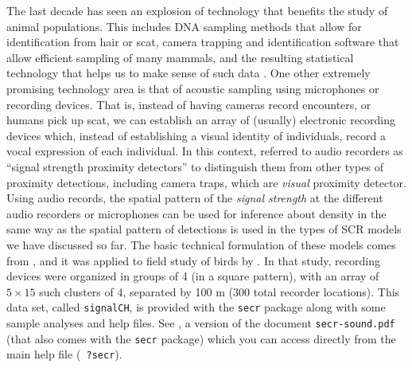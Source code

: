 The last decade has seen an explosion of technology that benefits the
study of animal populations. This includes DNA sampling methods that
allow for identification from hair or scat, camera trapping and
identification software that allow efficient sampling of many
mammals, and the resulting statistical technology that helps us to
make sense of such data \citep{borchers_efford:2008,
  royle_young:2008,efford_etal:2009ecol, gopalaswamy_etal:2012ecol,
  sollmann_etal:2012ecol, chandler_royle:2012}.  One other extremely
promising technology area is that of acoustic sampling using
microphones or recording devices.  That is, instead of having cameras
record encounters, or humans pick up scat, we can establish an array of
(usually) electronic recording devices which, instead of establishing
a visual identity of individuals, record a vocal expression of
each individual.  In this context, \citet{efford_etal:2009ecol}
referred to audio recorders as ``signal strength proximity detectors''
to distinguish them from other types of proximity detections,
including camera traps, which are {\it visual} proximity detector.
Using audio records, the spatial pattern of the {\it signal strength}
at the different audio recorders or microphones can be used for inference about density
\citep{dawson_efford:2009,efford_etal:2009ecol} in the same way as the
spatial pattern of detections is used in the types of SCR models we
have discussed so far.
The basic technical formulation of these
models comes from \citet{efford_etal:2009ecol}, and it was applied to
field study of birds by \citet{dawson_efford:2009}. In that study,
recording devices were organized in groups of 4 (in a square pattern),
with an array of $5 \times 15$ such clusters of 4, separated by 100 m
(300 total recorder locations).  This data set,
called \verb+signalCH+, %
is provided with the
\mbox{\tt secr} package along with some sample analyses and help
files.
See \citet{efford_dawson:2010}, a version of the document
\mbox{\tt secr-sound.pdf} (that also comes with the \mbox{\tt secr} package)
which you can access directly from the main help file (\mbox{\tt
  ?secr}).

